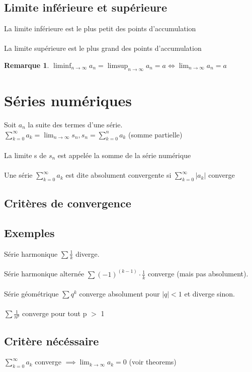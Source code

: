 \documentclass{article}
\newtheorem{remark}{Remarque}[section]
\begin{document}
\subsection{Limite inférieure et supérieure}
La limite inférieure est le plus petit des points d'accumulation \\\\
La limite supérieure est le plus grand des points d'accumulation
\begin{remark}
    $\liminf_{n\to\infty}a_n = \limsup_{n\to\infty}a_n = a \Leftrightarrow \lim_{n\to\infty}a_n = a$
\end{remark}

\section{Séries numériques}

Soit $ a_n $ la suite des termes d'une série. \\
$\sum_{k=0}^{\infty}a_k = \lim_{n\to\infty}s_n, s_n = \sum_{k=0}^{n}a_k$ (somme partielle) \\\\
La limite s de $s_n$ est appelée la somme de la série numérique \\\\
Une série $\sum_{k=0}^{\infty}a_k $ est dite absolument convergente si $\sum_{k=0}^{\infty}|a_k| $ converge
\subsection{Critères de convergence}

\subsection{Exemples}

Série harmonique $ \sum \frac{1}{k} $ diverge.\\\\
Série harmonique alternée $ \sum (-1)^{(k-1)} \cdot \frac{1}{k} $ converge (mais pas absolument).\\\\
Série géométrique $\sum q^k $ converge absolument pour $ |q| < 1 $ et diverge sinon.\\\\
$\sum \frac{1}{n^p}$ converge pour tout p $>$ 1

\subsection{Critère nécéssaire}
$\sum_{k=0}^{\infty}a_k$ converge $\implies \lim_{k\to\infty}a_k = 0$ (voir theorems)
\end{document}

